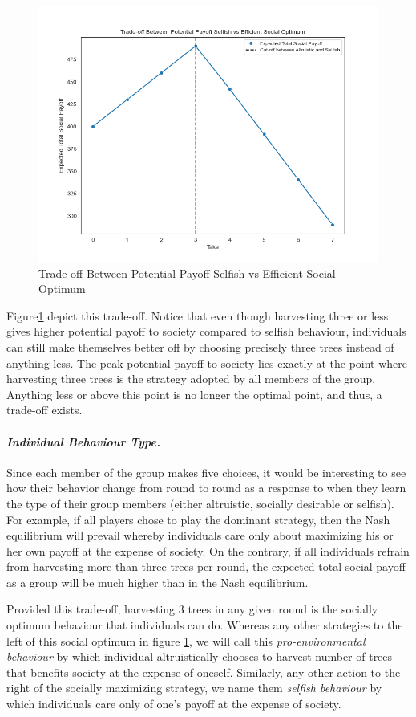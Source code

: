 \begin{figure}[H]
  \centering
  \includegraphics[width=0.6\linewidth]{../bld/graphs/0.Tradeoff1.png}
  \caption{Trade-off Between Potential Payoff Selfish vs Efficient Social Optimum}\label{fig:tradeoff2}
\end{figure}
 Figure\ref{fig:tradeoff2} depict this trade-off. Notice that even though harvesting three or less gives higher potential payoff to society compared to selfish behaviour, individuals can still make themselves better off by choosing precisely three trees instead of anything less. The peak potential payoff to society lies exactly at the point where harvesting three trees is the strategy adopted by all members of the group. Anything less or above this point is no longer the optimal point, and thus, a trade-off exists.

\paragraph{\textit{Individual Behaviour Type.}}
Since each member of the group makes five choices, it would be interesting to see how their behavior change from round to round as a response to when they learn the type of their group members (either altruistic, socially desirable or selfish). For example, if all players chose to play the dominant strategy, then the Nash equilibrium will prevail whereby individuals care only about maximizing his or her own payoff at the expense of society. On the contrary, if all individuals refrain from harvesting more than three trees per round, the expected total social payoff as a group will be much higher than in the Nash equilibrium.

 Provided this trade-off, harvesting 3 trees in any given round is the socially optimum behaviour that individuals can do. Whereas any other strategies to the left of this social optimum in figure \ref{fig:tradeoff2}, we will call this \textit{pro-environmental behaviour} by which individual altruistically chooses to harvest number of trees that benefits society at the expense of oneself. Similarly, any other action to the right of the socially maximizing strategy, we name them \textit{selfish behaviour} by which individuals care only of one's payoff at the expense of society.



